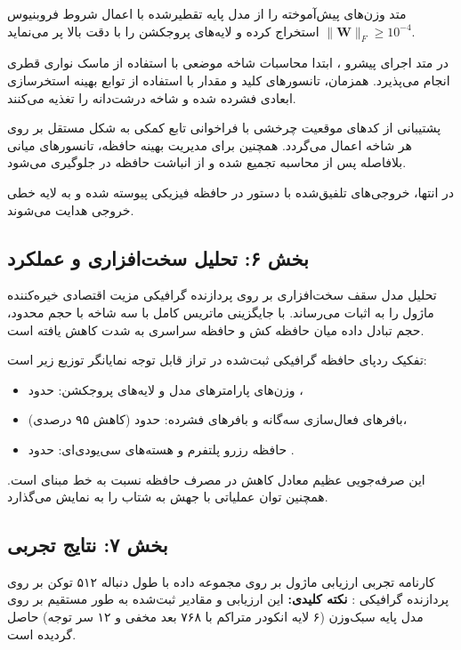 متد  وزن‌های پیش‌آموخته را از مدل پایه تقطیرشده  با اعمال شروط فروبنیوس $\|\mathbf{W}\|_F \ge 10^{-4}$ استخراج کرده و لایه‌های پروجکشن را با دقت بالا پر می‌نماید.

در متد اجرای پیشرو ، ابتدا محاسبات شاخه موضعی با استفاده از ماسک نواری قطری انجام می‌پذیرد. همزمان، تانسورهای کلید و مقدار با استفاده از توابع بهینه استخرسازی ابعادی فشرده شده و شاخه درشت‌دانه را تغذیه می‌کنند.

پشتیبانی از کدهای موقعیت چرخشی با فراخوانی تابع کمکی  به شکل مستقل بر روی هر شاخه اعمال می‌گردد. همچنین برای مدیریت بهینه حافظه، تانسورهای میانی بلافاصله پس از محاسبه تجمیع شده و از انباشت حافظه در  جلوگیری می‌شود.

در انتها، خروجی‌های تلفیق‌شده با دستور  در حافظه فیزیکی پیوسته شده و به لایه خطی خروجی هدایت می‌شوند.

\subsection*{بخش ۶: تحلیل سخت‌افزاری و عملکرد }
تحلیل مدل سقف سخت‌افزاری  بر روی پردازنده گرافیکی  مزیت اقتصادی خیره‌کننده ماژول  را به اثبات می‌رساند. با جایگزینی ماتریس کامل با سه شاخه با حجم محدود، حجم تبادل داده میان حافظه کش  و حافظه سراسری  به شدت کاهش یافته است.

تفکیک ردپای حافظه گرافیکی ثبت‌شده در تراز قابل توجه  نمایانگر توزیع زیر است:
\begin{itemize}
    \item وزن‌های پارامترهای مدل و لایه‌های پروجکشن: حدود ،
    \item بافرهای فعال‌سازی سه‌گانه و بافرهای فشرده: حدود  (کاهش ۹۵ درصدی)،
    \item حافظه رزرو پلتفرم و هسته‌های سی‌یو‌دی‌ای: حدود .
\end{itemize}

این صرفه‌جویی عظیم معادل کاهش  در مصرف حافظه نسبت به خط مبنای  است. همچنین توان عملیاتی با جهش به  شتاب  را به نمایش می‌گذارد.

\subsection*{بخش ۷: نتایج تجربی }
کارنامه تجربی ارزیابی ماژول  بر روی مجموعه داده  با طول دنباله ۵۱۲ توکن بر روی پردازنده گرافیکی :
\textbf{نکته کلیدی:} این ارزیابی و مقادیر ثبت‌شده به طور مستقیم بر روی مدل پایه سبک‌وزن  (۶ لایه انکودر متراکم با ۷۶۸ بعد مخفی و ۱۲ سر توجه) حاصل گردیده است.

